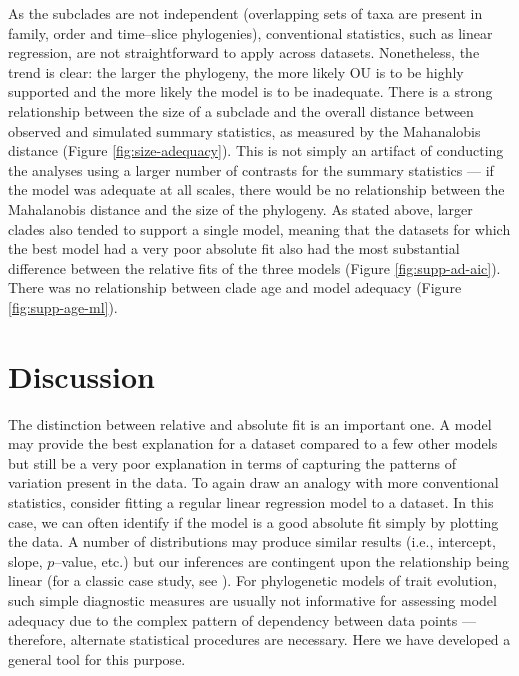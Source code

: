 \documentclass[a4paper,12pt]{article}
\begin{document}
As the subclades are not independent (overlapping sets of taxa are present in family, order and time--slice phylogenies), conventional statistics, such as linear regression, are not straightforward to apply across datasets. Nonetheless, the trend is clear: the larger the phylogeny, the more likely OU is to be highly supported and the more likely the model is to be inadequate. There is a strong relationship between the size of a subclade and the overall distance between observed and simulated summary statistics, as measured by the Mahanalobis distance (Figure \ref{fig:size-adequacy}). This is not simply an artifact of conducting the analyses using a larger number of contrasts for the summary statistics --- if the model was adequate at all scales, there would be no relationship between the Mahalanobis distance and the size of the phylogeny. As stated above, larger clades also tended to support a single model, meaning that the datasets for which the best model had a very poor absolute fit also had the most substantial difference between the relative fits of the three models (Figure \ref{fig:supp-ad-aic}). There was no relationship between clade age and model adequacy (Figure \ref{fig:supp-age-ml}).


\section{Discussion}

The distinction between relative and absolute fit is an important one. A model may provide the best explanation for a dataset compared to a few other models but still be a very poor explanation in terms of capturing the patterns of variation present in the data. To again draw an analogy with more conventional statistics, consider fitting a regular linear regression model to a dataset. In this case, we can often identify if the model is a good absolute fit simply by plotting the data. A number of distributions may produce similar results (i.e., intercept, slope, $p$--value, etc.) but our inferences are contingent upon the relationship being linear (for a classic case study, see \citep{anscombe1973}). For phylogenetic models of trait evolution, such simple diagnostic measures are usually not informative for assessing model adequacy due to the complex pattern of dependency between data points --- therefore, alternate statistical procedures are necessary. Here we have developed a general tool for this purpose. 
\end{document}
